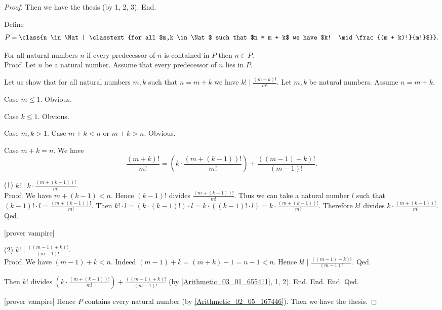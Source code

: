 \documentclass[../../arithmetic.tex]{subfiles}
\begin{document}
\begin{forthel}
\begin{proof}
        Then we have the thesis (by 1, 2, 3).
      End.

      Define \[ P = \class{n \in \Nat | \classtext{for all $m,k \in \Nat$ such that $n = m + k$ we have $k! \mid \frac{(m + k)!}{m!}$}}. \]

      For all natural numbers $n$ if every predecessor of $n$ is contained in $P$ then $n \in P$. \\
      Proof.
        Let $n$ be a natural number.
        Assume that every predecessor of $n$ lies in $P$.

        Let us show that for all natural numbers $m,k$ such that $n = m + k$ we have $k! \mid \frac{(m + k)!}{m!}$.
          Let $m,k$ be natural numbers.
          Assume $n = m + k$.

          Case $m \leq 1$. Obvious.

          Case $k \leq 1$. Obvious.

          Case $m,k > 1$.
            Case $m + k < n$ or $m + k > n$. Obvious.

            Case $m + k = n$.
              We have \[ \frac{(m + k)!}{m!} = \left( k \cdot \frac{(m + (k - 1))!}{m!} \right) + \frac{((m - 1) + k)!}{(m - 1)!}. \]

              (1) $k! \mid k \cdot \frac{(m + (k - 1))!}{m!}$. \\
              Proof.
                We have $m + (k - 1) < n$.
                Hence $(k - 1)!$ divides $\frac{(m + (k - 1))!}{m!}$.
                Thus we can take a natural number $l$ such that $(k - 1)! \cdot l = \frac{(m + (k - 1))!}{m!}$.
                Then $k! \cdot l = (k \cdot (k - 1)!) \cdot l = k \cdot ((k - 1)! \cdot l) = k \cdot \frac{(m + (k - 1))!}{m!}$.
                Therefore $k!$ divides $k \cdot \frac{(m + (k - 1))!}{m!}$.
              Qed.

              [prover vampire]

              (2) $k! \mid \frac{((m - 1) + k)!}{(m - 1)!}$. \\
              Proof.
                We have $(m - 1) + k < n$.
                Indeed $(m - 1) + k = (m + k) - 1 = n - 1 < n$.
                Hence $k! \mid \frac{((m - 1) + k)!}{(m - 1)!}$.
              Qed.

              Then $k!$ divides $\left( k \cdot \frac{(m + (k - 1))!}{m!} \right) + \frac{((m - 1) + k)!}{(m - 1)!}$ (by \ref{Arithmetic_03_01_655411}, 1, 2).
            End.
          End.
        End.
      Qed.

      [prover vampire]
      Hence $P$ contains every natural number (by \ref{Arithmetic_02_05_167446}).
      Then we have the thesis.
    \end{proof}


\end{forthel}
\end{document}
